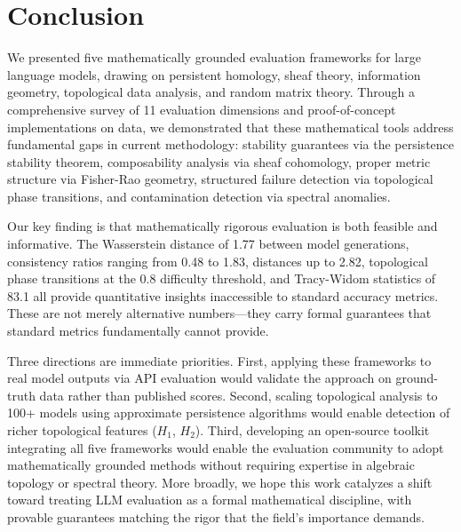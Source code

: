 \section{Conclusion}
\label{sec:conclusion}

We presented five mathematically grounded evaluation frameworks for large language models, drawing on persistent homology, sheaf theory, information geometry, topological data analysis, and random matrix theory.
Through a comprehensive survey of 11 evaluation dimensions and proof-of-concept implementations on \mmlu data, we demonstrated that these mathematical tools address fundamental gaps in current methodology: stability guarantees via the persistence stability theorem, composability analysis via sheaf cohomology, proper metric structure via Fisher-Rao geometry, structured failure detection via topological phase transitions, and contamination detection via spectral anomalies.

Our key finding is that mathematically rigorous evaluation is both feasible and informative.
The Wasserstein distance of 1.77 between model generations, consistency ratios ranging from 0.48 to 1.83, \fr distances up to 2.82, topological phase transitions at the 0.8 difficulty threshold, and Tracy-Widom statistics of 83.1 all provide quantitative insights inaccessible to standard accuracy metrics.
These are not merely alternative numbers---they carry formal guarantees that standard metrics fundamentally cannot provide.

Three directions are immediate priorities.
First, applying these frameworks to real model outputs via API evaluation would validate the approach on ground-truth data rather than published scores.
Second, scaling topological analysis to 100+ models using approximate persistence algorithms would enable detection of richer topological features ($H_1$, $H_2$).
Third, developing an open-source toolkit integrating all five frameworks would enable the evaluation community to adopt mathematically grounded methods without requiring expertise in algebraic topology or spectral theory.
More broadly, we hope this work catalyzes a shift toward treating LLM evaluation as a formal mathematical discipline, with provable guarantees matching the rigor that the field's importance demands.
